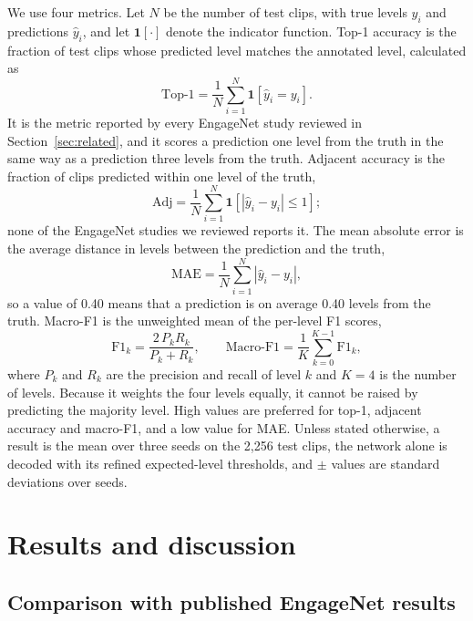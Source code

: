 \documentclass[pdflatex,iicol,sn-basic]{sn-jnl}
\begin{document}
We use four metrics. Let $N$ be the number of test clips, with true levels $y_i$ and predictions $\hat{y}_i$, and let $\mathbf{1}[\cdot]$ denote the indicator function. Top-1 accuracy is the fraction of test clips whose predicted level matches the annotated level, calculated as
\begin{equation}
\mathrm{Top\text{-}1} = \frac{1}{N} \sum_{i=1}^{N} \mathbf{1}[\hat{y}_i = y_i].
\label{eq:top1}
\end{equation}
It is the metric reported by every EngageNet study reviewed in Section~\ref{sec:related}, and it scores a prediction one level from the truth in the same way as a prediction three levels from the truth. Adjacent accuracy is the fraction of clips predicted within one level of the truth,
\begin{equation}
\mathrm{Adj} = \frac{1}{N} \sum_{i=1}^{N} \mathbf{1}[|\hat{y}_i - y_i| \leq 1];
\label{eq:adj}
\end{equation}
none of the EngageNet studies we reviewed reports it. The mean absolute error is the average distance in levels between the prediction and the truth,
\begin{equation}
\mathrm{MAE} = \frac{1}{N} \sum_{i=1}^{N} |\hat{y}_i - y_i|,
\label{eq:mae}
\end{equation}
so a value of 0.40 means that a prediction is on average 0.40 levels from the truth. Macro-F1 is the unweighted mean of the per-level F1 scores,
\begin{equation}
\mathrm{F1}_k = \frac{2\,P_k R_k}{P_k + R_k}, \qquad \mathrm{Macro\text{-}F1} = \frac{1}{K} \sum_{k=0}^{K-1} \mathrm{F1}_k,
\label{eq:f1}
\end{equation}
where $P_k$ and $R_k$ are the precision and recall of level $k$ and $K = 4$ is the number of levels. Because it weights the four levels equally, it cannot be raised by predicting the majority level. High values are preferred for top-1, adjacent accuracy and macro-F1, and a low value for MAE. Unless stated otherwise, a result is the mean over three seeds on the 2,256 test clips, the network alone is decoded with its refined expected-level thresholds, and $\pm$ values are standard deviations over seeds.

\section{Results and discussion}\label{sec:results}

\subsection{Comparison with published EngageNet results}\label{sec:res_sota}
\end{document}
